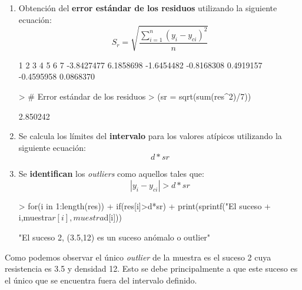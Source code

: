 \documentclass [a4paper] {article}
\begin{document}
\begin{enumerate}
\begin{Schunk}
\end{Schunk}
	\item Obtención del \textbf{error estándar de los residuos} utilizando la siguiente ecuación:
		  \begin{equation*}
			S_{r} = \sqrt{\frac{\sum_{i=1}^{n} (y_{i} - y_{ci})^2}{n}}
		  \end{equation*}
\begin{Schunk}
\begin{Soutput}
         1          2          3          4          5          6          7 
-3.8427477  6.1858698 -1.6454482 -0.8168308  0.4919157 -0.4595958  0.0868370 
\end{Soutput}
\begin{Sinput}
> # Error estándar de los residuos
> (sr = sqrt(sum(res^2)/7))
\end{Sinput}
\begin{Soutput}
[1] 2.850242
\end{Soutput}
\end{Schunk}
	\item Se calcula los límites del \textbf{intervalo} para los valores atípicos utilizando la siguiente ecuación:
	      \begin{equation*}
			d*sr
		  \end{equation*}
	\item Se \textbf{identifican} los \textit{outliers} como aquellos tales que:
		  \begin{equation*}
			|y_{i} - y_{ci}| > d*sr 
		  \end{equation*}
\begin{Schunk}
\begin{Sinput}
> for(i in 1:length(res))
+ 	if(res[i]>d*sr)
+ 		print(sprintf("El suceso %d, (%.1f,%d) es un suceso anómalo o outlier",
+ 		      i,muestra$r[i],muestra$d[i]))
\end{Sinput}
\begin{Soutput}
[1] "El suceso 2, (3.5,12) es un suceso anómalo o outlier"
\end{Soutput}
\end{Schunk}
\end{enumerate}
Como podemos observar el único \textit{outlier} de la muestra es el suceso 2 cuya resistencia es 3.5
y densidad 12. Esto se debe principalmente a que este suceso es el único que se encuentra fuera del
intervalo definido.
\end{document}
